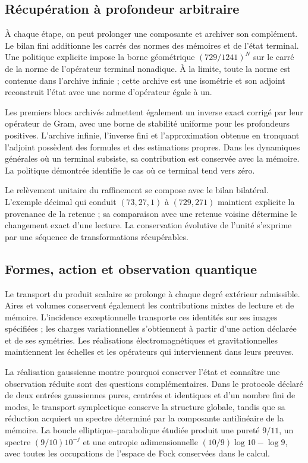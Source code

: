 \subsection*{Récupération à profondeur arbitraire}
À chaque étape, on peut prolonger une composante et archiver son complément. Le bilan fini additionne les carrés des normes des mémoires et de l'état terminal. Une politique explicite impose la borne géométrique \((729/1241)^N\) sur le carré de la norme de l'opérateur terminal nonadique. À la limite, toute la norme est contenue dans l'archive infinie ; cette archive est une isométrie et son adjoint reconstruit l'état avec une norme d'opérateur égale à un.

Les premiers blocs archivés admettent également un inverse exact corrigé par leur opérateur de Gram, avec une borne de stabilité uniforme pour les profondeurs positives. L’archive infinie, l’inverse fini et l’approximation obtenue en tronquant l’adjoint possèdent des formules et des estimations propres. Dans les dynamiques générales où un terminal subsiste, sa contribution est conservée avec la mémoire. La politique démontrée identifie le cas où ce terminal tend vers zéro.

Le relèvement unitaire du raffinement se compose avec le bilan bilatéral. L’exemple décimal qui conduit \((73,27,1)\) à \((729,271)\) maintient explicite la provenance de la retenue ; sa comparaison avec une retenue voisine détermine le changement exact d’une lecture. La conservation évolutive de l’unité s’exprime par une séquence de transformations récupérables.




\subsection*{Formes, action et observation quantique}
Le transport du produit scalaire se prolonge à chaque degré extérieur admissible. Aires et volumes conservent également les contributions mixtes de lecture et de mémoire. L'incidence exceptionnelle transporte ces identités sur ses images spécifiées ; les charges variationnelles s'obtiennent à partir d'une action déclarée et de ses symétries. Les réalisations électromagnétiques et gravitationnelles maintiennent les échelles et les opérateurs qui interviennent dans leurs preuves.

La réalisation gaussienne montre pourquoi conserver l’état et connaître une observation réduite sont des questions complémentaires. Dans le protocole déclaré de deux entrées gaussiennes pures, centrées et identiques et d’un nombre fini de modes, le transport symplectique conserve la structure globale, tandis que sa réduction acquiert un spectre déterminé par la composante antilinéaire de la mémoire. La boucle elliptique--parabolique étudiée produit une pureté \(9/11\), un spectre \((9/10)10^{-j}\) et une entropie adimensionnelle \((10/9)\log10-\log9\), avec toutes les occupations de l’espace de Fock conservées dans le calcul.


